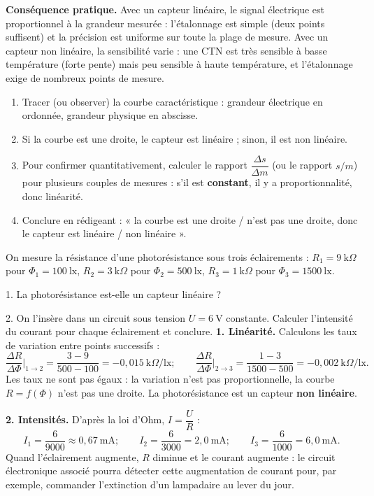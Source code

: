 \documentclass[11pt]{article}
\begin{document}
\textbf{Conséquence pratique.} Avec un capteur linéaire, le signal électrique est proportionnel à la grandeur mesurée : l'étalonnage est simple (deux points suffisent) et la précision est uniforme sur toute la plage de mesure. Avec un capteur non linéaire, la sensibilité varie : une CTN est très sensible à basse température (forte pente) mais peu sensible à haute température, et l'étalonnage exige de nombreux points de mesure.

\begin{methode}
\begin{enumerate}
\item Tracer (ou observer) la courbe caractéristique : grandeur électrique en ordonnée, grandeur physique en abscisse.
\item Si la courbe est une droite, le capteur est linéaire ; sinon, il est non linéaire.
\item Pour confirmer quantitativement, calculer le rapport $\dfrac{\Delta s}{\Delta m}$ (ou le rapport $s/m$) pour plusieurs couples de mesures : s'il est \textbf{constant}, il y a proportionnalité, donc linéarité.
\item Conclure en rédigeant : « la courbe est une droite / n'est pas une droite, donc le capteur est linéaire / non linéaire ».
\end{enumerate}
\end{methode}

\begin{exoresolu}
On mesure la résistance d'une photorésistance sous trois éclairements : $R_1 = 9~\text{k}\Omega$ pour $\Phi_1 = 100~\text{lx}$, $R_2 = 3~\text{k}\Omega$ pour $\Phi_2 = 500~\text{lx}$, $R_3 = 1~\text{k}\Omega$ pour $\Phi_3 = 1500~\text{lx}$.

1. La photorésistance est-elle un capteur linéaire ?

2. On l'insère dans un circuit sous tension $U = 6~\text{V}$ constante. Calculer l'intensité du courant pour chaque éclairement et conclure.
\tcblower
\textbf{1. Linéarité.} Calculons les taux de variation entre points successifs :
\[ \frac{\Delta R}{\Delta \Phi}\bigg|_{1\to 2} = \frac{3 - 9}{500 - 100} = -0{,}015~\text{k}\Omega/\text{lx} ; \qquad \frac{\Delta R}{\Delta \Phi}\bigg|_{2\to 3} = \frac{1 - 3}{1500 - 500} = -0{,}002~\text{k}\Omega/\text{lx}. \]
Les taux ne sont pas égaux : la variation n'est pas proportionnelle, la courbe $R = f(\Phi)$ n'est pas une droite. La photorésistance est un capteur \textbf{non linéaire}.

\textbf{2. Intensités.} D'après la loi d'Ohm, $I = \dfrac{U}{R}$ :
\[ I_1 = \frac{6}{9000} \approx 0{,}67~\text{mA} ; \qquad I_2 = \frac{6}{3000} = 2{,}0~\text{mA} ; \qquad I_3 = \frac{6}{1000} = 6{,}0~\text{mA}. \]
Quand l'éclairement augmente, $R$ diminue et le courant augmente : le circuit électronique associé pourra détecter cette augmentation de courant pour, par exemple, commander l'extinction d'un lampadaire au lever du jour.
\end{exoresolu}
\end{document}
